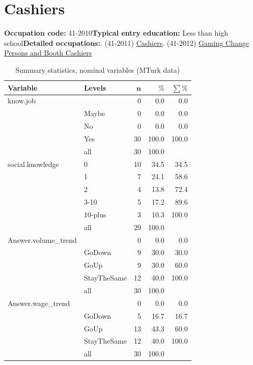 \documentclass[a4paper,10pt]{article}\usepackage[]{graphicx}\usepackage[]{color}
\begin{document}
\newpage\section{Cashiers}\textbf{Occupation code:} 41-2010\newline\textbf{Typical entry education:} Less than high school\newline\textbf{Detailed occupations:}. (41-2011)  \href{http://www.bls.gov/oes/current/oes412011.htm}{Cashiers}. (41-2012)  \href{http://www.bls.gov/oes/current/oes412012.htm}{Gaming Change Persons and Booth Cashiers}\newline%
\begin{table}[ht]
\centering
{\footnotesize
\begin{tabular}{ll|rrr}
 \textbf{Variable} & \textbf{Levels} & $\mathbf{n}$ & $\mathbf{\%}$ & $\mathbf{\sum \%}$ \\ 
  \hline
know.job &  & 0 & 0.0 & 0.0 \\ 
   & Maybe & 0 & 0.0 & 0.0 \\ 
   & No & 0 & 0.0 & 0.0 \\ 
   & Yes & 30 & 100.0 & 100.0 \\ 
   \hline
 & all & 30 & 100.0 &  \\ 
   \hline
\hline
social.knowledge & 0 & 10 & 34.5 & 34.5 \\ 
   & 1 & 7 & 24.1 & 58.6 \\ 
   & 2 & 4 & 13.8 & 72.4 \\ 
   & 3-10 & 5 & 17.2 & 89.6 \\ 
   & 10-plus & 3 & 10.3 & 100.0 \\ 
   \hline
 & all & 29 & 100.0 &  \\ 
   \hline
\hline
Answer.volume\_trend &  & 0 & 0.0 & 0.0 \\ 
   & GoDown & 9 & 30.0 & 30.0 \\ 
   & GoUp & 9 & 30.0 & 60.0 \\ 
   & StayTheSame & 12 & 40.0 & 100.0 \\ 
   \hline
 & all & 30 & 100.0 &  \\ 
   \hline
\hline
Answer.wage\_trend &  & 0 & 0.0 & 0.0 \\ 
   & GoDown & 5 & 16.7 & 16.7 \\ 
   & GoUp & 13 & 43.3 & 60.0 \\ 
   & StayTheSame & 12 & 40.0 & 100.0 \\ 
   \hline
 & all & 30 & 100.0 &  \\ 
   \hline
\hline
\end{tabular}
}
\caption{Summary statistics, nominal variables (MTurk data)} 
\label{tab1:41-2010}
\end{table}
\end{document}
